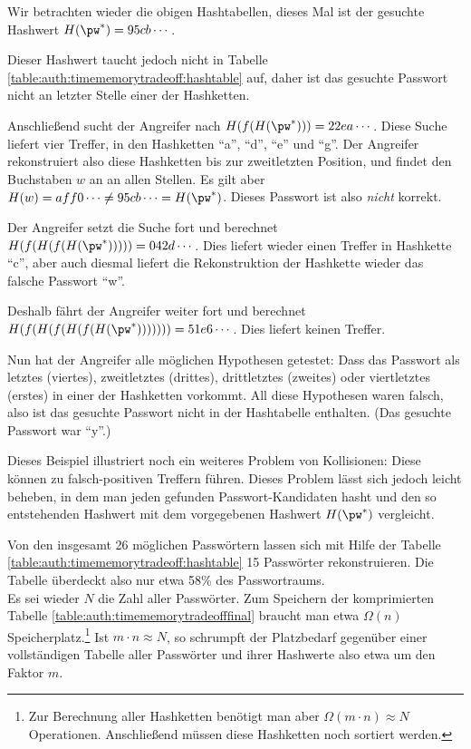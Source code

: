 \begin{beispiel}
	Wir betrachten wieder die obigen Hashtabellen, dieses Mal ist der gesuchte Hashwert $H(\pw^*) = 95cb\cdots$.
	
	Dieser Hashwert taucht jedoch nicht in Tabelle \ref{table:auth:timememorytradeoff:hashtable} auf, daher ist das gesuchte Passwort nicht an letzter Stelle einer der Hashketten.
	
	Anschließend sucht der Angreifer nach $H(f(H(\pw^*))) = 22ea\cdots$. Diese Suche liefert vier Treffer, in den Hashketten "`a"', "`d"', "`e"' und "`g"'. Der Angreifer rekonstruiert also diese Hashketten bis zur zweitletzten Position, und findet den Buchstaben $w$ an an allen Stellen. Es gilt aber $H(w) = aff0\cdots \neq 95cb\cdots = H(\pw^*)$. Dieses Passwort ist also \emph{nicht} korrekt.
	
	Der Angreifer setzt die Suche fort und berechnet $H(f(H(f(H(\pw^*))))) = 042d\cdots$. Dies liefert wieder einen Treffer in Hashkette "`c"', aber auch diesmal liefert die Rekonstruktion der Hashkette wieder das falsche Passwort "`w"'.
	
	Deshalb fährt der Angreifer weiter fort und berechnet $H(f(H(f(H(f(H(\pw^*))))))) = 51e6\cdots$. Dies liefert keinen Treffer.
	
	Nun hat der Angreifer alle möglichen Hypothesen getestet: Dass das Passwort als letztes (viertes), zweitletztes (drittes), drittletztes (zweites) oder viertletztes (erstes) in einer der Hashketten vorkommt.
	All diese Hypothesen waren falsch, also ist das gesuchte Passwort nicht in der Hashtabelle enthalten.
	(Das gesuchte Passwort war "`y"'.)\\
\end{beispiel}

Dieses Beispiel illustriert noch ein weiteres Problem von Kollisionen: Diese können zu falsch-positiven Treffern führen. Dieses Problem lässt sich jedoch leicht beheben, in dem man jeden gefunden Passwort-Kandidaten hasht und den so entstehenden Hashwert mit dem vorgegebenen Hashwert $H(\pw^*)$ vergleicht.

Von den insgesamt 26 möglichen Passwörtern lassen sich mit Hilfe der Tabelle \ref{table:auth:timememorytradeoff:hashtable} 15 Passwörter rekonstruieren. Die Tabelle überdeckt also nur etwa 58\% des Passwortraums.\\

Es sei wieder $N$ die Zahl aller Passwörter. Zum Speichern der komprimierten Tabelle \ref{table:auth:timememorytradeofffinal} braucht man etwa $\Omega(n)$ Speicherplatz.\footnote{Zur Berechnung aller Hashketten benötigt man aber $\Omega(m \cdot n) \approx N$ Operationen. Anschließend müssen diese Hashketten noch sortiert werden.} Ist $m \cdot n \approx N$, so schrumpft der Platzbedarf gegenüber einer vollständigen Tabelle aller Passwörter und ihrer Hashwerte also etwa um den Faktor $m$.

